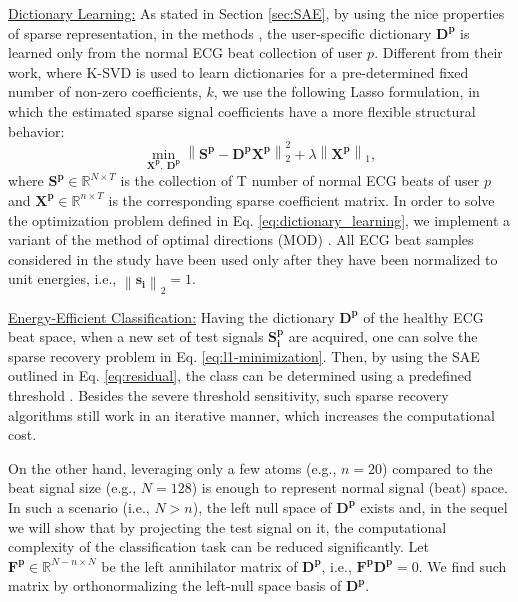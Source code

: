 \documentclass[journal,transmag]{IEEEtran}
\begin{document}
\underline{Dictionary Learning:} As stated in Section \ref{sec:SAE}, by using the nice properties of sparse representation, in the methods \cite{carrera2016ecg, carrera2019online}, the user-specific dictionary $\bm{{D^p}}$ is learned only from the normal ECG beat collection of user $p$. Different from their work, where K-SVD is used to learn dictionaries for a pre-determined fixed number of non-zero coefficients, $k$, we use the following Lasso formulation, in which the estimated sparse signal coefficients have a more flexible structural behavior:
\begin{equation}
    \min_{\bm{X^p}, ~\bm{{D^p}}} \left\| \bm{S^p}-  \bm{{D^p}} \bm{X^p} \right\|_2^2 + \lambda \left\| \bm{X^p} \right\|_1, \label{eq:dictionary_learning}
\end{equation}
where $\bm{S^p} \in \mathbb{R}^{N \times T}$ is the collection of T number of normal ECG beats of user $p$ and $\bm{X^p} \in \mathbb{R}^{n \times T}$ is the corresponding sparse coefficient matrix. In order to solve the optimization problem defined in Eq. \eqref{eq:dictionary_learning}, we implement a variant of the method of optimal directions (MOD) \cite{MOD}. All ECG beat samples considered in the study have been used only after they have been normalized to unit energies, i.e.,  $ \left\| \bm{s_i} \right\|_2 = 1$.

\underline{Energy-Efficient Classification:}
Having the dictionary $\bm{{D^p}}$ of the healthy ECG beat space, when a new set of test signals $\bm{S^p_i}$ are acquired, one can solve the sparse recovery problem in Eq. \eqref{eq:l1-minimization}. Then, by using the SAE outlined in Eq. \eqref{eq:residual}, the class can be determined using a predefined threshold \cite{carrera2016ecg}. Besides the severe threshold sensitivity, such sparse recovery algorithms still work in an iterative manner, which increases the computational cost.

On the other hand, leveraging only a few atoms (e.g., $n=20$) compared to the beat signal size (e.g., $N=128$) is enough to represent normal signal (beat) space. In such a scenario (i.e., $N>n$), the left null space of $\bm{{D^p}}$ exists and, in the sequel we will show that by projecting the test signal on it, the computational complexity of the classification task can be reduced significantly. Let $\bm{F^p} \in \mathbb{R}^{N-n \times N}$  be the left annihilator matrix of $\bm{{D^p}}$, i.e., $\bm{F^p} \bm{{D^p}}=0$. We find such matrix by orthonormalizing the left-null space basis of $\bm{{D^p}}$.
\end{document}
